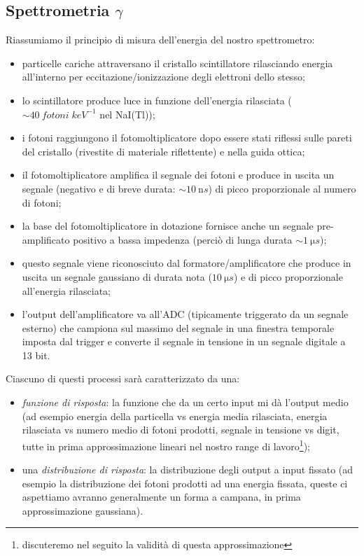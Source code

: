 \subsection{Spettrometria $\gamma$}
Riassumiamo il principio di misura dell'energia del nostro spettrometro:
\begin{itemize}
	\item particelle cariche attraversano il cristallo scintillatore rilasciando energia all'interno per eccitazione/ionizzazione degli elettroni dello stesso;
	\item lo scintillatore produce luce in funzione dell'energia rilasciata ($\sim \SI{40}{fotoni \; keV^{-1}}$ nel NaI(Tl));
	\item i fotoni raggiungono il fotomoltiplicatore dopo essere stati riflessi sulle pareti del cristallo (rivestite di materiale riflettente) e nella guida ottica;
	\item il fotomoltiplicatore amplifica il segnale dei fotoni e produce in uscita un segnale (negativo e di breve durata: $\sim \SI{10}{\nano s}$) di picco proporzionale al numero di fotoni;
	\item la base del fotomoltiplicatore in dotazione fornisce anche un segnale pre-amplificato positivo a bassa impedenza (perciò di lunga durata $\sim \SI{1}{\micro s}$);
	\item questo segnale viene riconosciuto dal formatore/amplificatore che produce in uscita un segnale gaussiano di durata nota ($\SI{10}{\micro s}$) e di picco proporzionale all'energia rilasciata;
	\item l'output dell'amplificatore va all'ADC (tipicamente triggerato da un segnale esterno) che campiona sul massimo del segnale in una finestra temporale imposta dal trigger e converte il segnale in tensione in un segnale digitale a 13 bit.
\end{itemize}
Ciascuno di questi processi sarà caratterizzato da una:
\begin{itemize}
	\item\emph{funzione di risposta}: la funzione che da un certo input mi dà l'output medio (ad esempio energia della particella vs energia media rilasciata, energia rilasciata vs numero medio di fotoni prodotti, segnale in tensione vs digit, tutte in prima approssimazione lineari nel nostro range di lavoro\footnote{discuteremo nel seguito la validità di questa approssimazione});
    \item una \emph{distribuzione di risposta}: la distribuzione degli output a input fissato (ad esempio la distribuzione dei fotoni prodotti ad una energia fissata, queste ci aspettiamo avranno generalmente un forma a campana, in prima approssimazione gaussiana).
\end{itemize}

